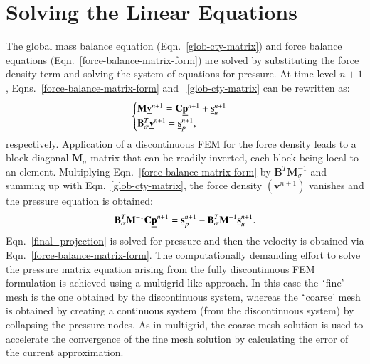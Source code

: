 \documentclass[preprint,authoryear,12pt]{elsarticle}
\begin{document}
\section{Solving the Linear Equations}\label{Section:SolvingLinearEqns}
The global mass balance equation (Eqn.~\ref{glob-cty-matrix}) and force balance equations (Eqn.~\ref{force-balance-matrix-form}) are solved by substituting the force density term and solving the system of equations for pressure. At time level $n+1$, Eqns.~\ref{force-balance-matrix-form} and ~\ref{glob-cty-matrix} can be rewritten as:
\begin{displaymath}
\begin{cases}
 \mathbf{M} \underline{\bf v}^{n+1} = \mathbf{C}\underline{\bf p}^{n+1} + \underline{\bf s}_{u}^{n+1} \\ %
 \mathbf{B}_\sigma^{T} \underline{\bf v}^{n+1} = \underline{\bf s}_{p}^{n+1},%
\end{cases}
\end{displaymath}
respectively. Application of a discontinuous FEM for the force density leads to a block-diagonal $\mathbf{M}_{\sigma}$ matrix that can be readily inverted, each block being local to an element. Multiplying Eqn.~\ref{force-balance-matrix-form} by $\mathbf{B}^{T}\mathbf{M}_{\sigma}^{-1}$ and summing up with Eqn.~\ref{glob-cty-matrix}, the force density $\left(\underline{\mathbf v}^{n+1}\right)$ vanishes and the pressure equation is obtained:
\begin{equation}
  \mathbf{B}_\sigma^{T}\mathbf{M}^{-1} \mathbf{C} \underline{\bf p}^{n+1} = \underline{\bf s}_{p}^{n+1} - \mathbf{B}_\sigma^{T} \mathbf{M}^{-1} \underline{\bf s}_{u}^{n+1}.
  \label{final_projection}
\end{equation}
Eqn.~\ref{final_projection} is solved for pressure and then the velocity is obtained via Eqn.~\ref{force-balance-matrix-form}. The computationally demanding effort to solve the pressure matrix equation arising from the fully discontinuous FEM formulation is achieved using a multigrid-like approach. In this case the $\lq$fine' mesh is the one obtained by the discontinuous system, whereas the $\lq$coarse' mesh is obtained by creating a continuous system (from the discontinuous system) by collapsing the pressure nodes. As in multigrid, the coarse mesh solution is used to accelerate the convergence of the fine mesh solution by calculating the error of the current approximation.
\end{document}
